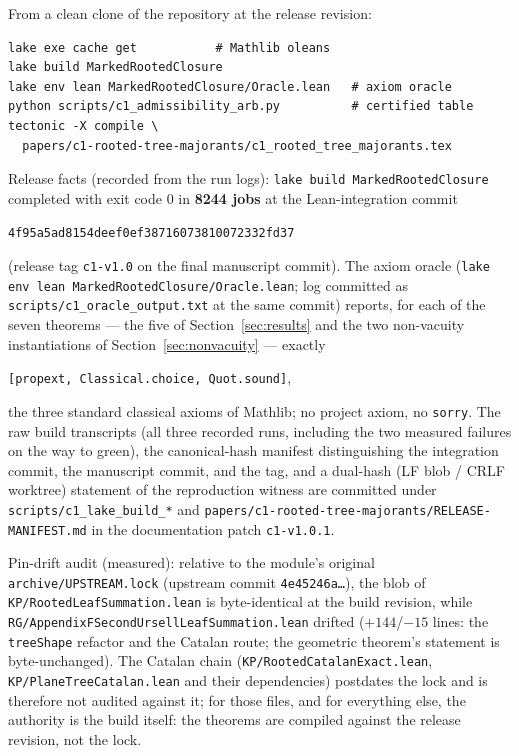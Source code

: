 \documentclass[11pt]{article}
\newcommand{\lean}[1]{\texttt{#1}}
\begin{document}
\medskip
\noindent From a clean clone of the repository at the release
revision:
\begin{verbatim}
lake exe cache get           # Mathlib oleans
lake build MarkedRootedClosure
lake env lean MarkedRootedClosure/Oracle.lean   # axiom oracle
python scripts/c1_admissibility_arb.py          # certified table
tectonic -X compile \
  papers/c1-rooted-tree-majorants/c1_rooted_tree_majorants.tex
\end{verbatim}
\noindent Release facts (recorded from the run logs):
\lean{lake build MarkedRootedClosure} completed with exit code $0$ in
\textbf{8244 jobs} at the Lean-integration commit
\begin{center}\small
\lean{4f95a5ad8154deef0ef38716073810072332fd37}
\end{center}
\noindent (release tag \lean{c1-v1.0} on the final manuscript
commit).  The axiom oracle
(\lean{lake env lean MarkedRootedClosure/Oracle.lean}; log committed
as \lean{scripts/c1\_oracle\_output.txt} at the same commit) reports,
for each of the seven theorems --- the five of
Section~\ref{sec:results} and the two non-vacuity instantiations of
Section~\ref{sec:nonvacuity} --- exactly
\begin{center}
\lean{[propext, Classical.choice, Quot.sound]},
\end{center}
\noindent the three standard classical axioms of Mathlib; no project
axiom, no \lean{sorry}.  The raw build transcripts (all three
recorded runs, including the two measured failures on the way to
green), the canonical-hash manifest distinguishing the integration
commit, the manuscript commit, and the tag, and a dual-hash (LF
blob / CRLF worktree) statement of the reproduction witness are
committed under \lean{scripts/c1\_lake\_build\_*} and
\lean{papers/c1-rooted-tree-majorants/RELEASE-MANIFEST.md} in the
documentation patch \lean{c1-v1.0.1}.

Pin-drift audit (measured): relative to the module's original
\lean{archive/UPSTREAM.lock} (upstream commit \lean{4e45246a\ldots}),
the blob of \lean{KP/RootedLeafSummation.lean} is byte-identical at
the build revision, while
\lean{RG/AppendixFSecondUrsellLeafSummation.lean} drifted
($+144$/$-15$ lines: the \lean{treeShape} refactor and the Catalan
route; the geometric theorem's statement is byte-unchanged).  The
Catalan chain (\lean{KP/RootedCatalanExact.lean},
\lean{KP/PlaneTreeCatalan.lean} and their dependencies) postdates the
lock and is therefore not audited against it; for those files, and
for everything else, the authority is the build itself: the theorems
are compiled against the release revision, not the lock.
\end{document}

